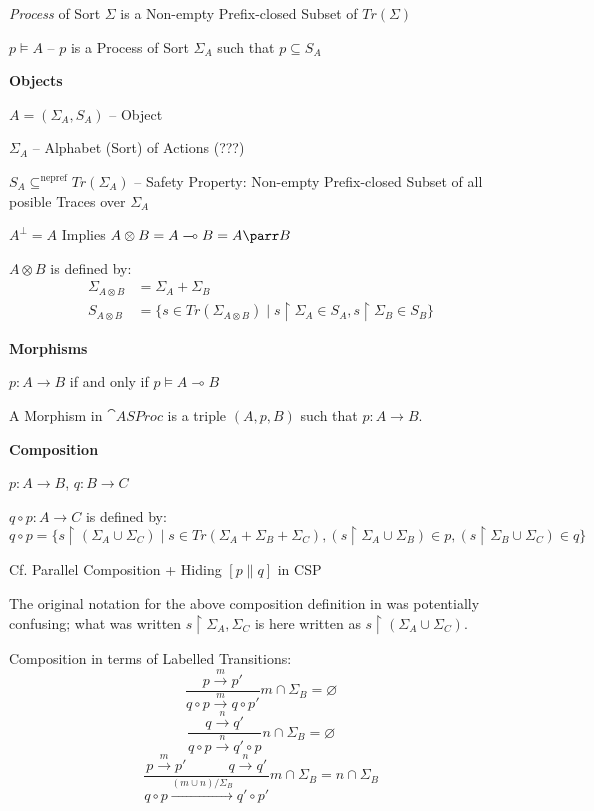 \emph{Process} of Sort $\Sigma$ is a Non-empty Prefix-closed Subset of
$Tr(\Sigma)$

$p \vDash A$ -- $p$ is a Process of Sort $\Sigma_A$ such that $p
\subseteq S_A$


\textbf{Objects}

$A = (\Sigma_A,S_A)$ -- Object

$\Sigma_A$ -- Alphabet (Sort) of Actions (???)

$S_A \subseteq^{\mathrm{nepref}} Tr(\Sigma_A)$ -- Safety Property:
Non-empty Prefix-closed Subset of all posible Traces over $\Sigma_A$

$A^\bot = A$ Implies $A \otimes B = A \multimap B = A \parr B$

$A \otimes B$ is defined by:
\begin{align*}
  \Sigma_{A \otimes B} &= \Sigma_A + \Sigma_B \\
  S_{A \otimes B} &= \{s \in Tr(\Sigma_{A \otimes B})
    \mid s \upharpoonright \Sigma_A \in S_A,
    s \upharpoonright \Sigma_B \in S_B\}
\end{align*}


\textbf{Morphisms}

$p : A \rightarrow B$ if and only if $p \vDash A \multimap B$

A Morphism in $\cat{ASProc}$ is a triple $(A,p,B)$ such that $p : A
\rightarrow B$.


\textbf{Composition}

$p : A \rightarrow B$, $q : B \rightarrow C$

$q \circ p : A \rightarrow C$ is defined by:
\[
  q \circ p = \{s \upharpoonright (\Sigma_A \cup \Sigma_C)
    \mid s \in Tr(\Sigma_A + \Sigma_B + \Sigma_C),
    (s \upharpoonright \Sigma_A \cup \Sigma_B) \in p,
    (s \upharpoonright \Sigma_B \cup \Sigma_C) \in q\}
\]

\fist Cf. Parallel Composition + Hiding $[p{\parallel}q]$ in CSP

\fist The original notation for the above composition definition in
\cite{abramsky-gay-nagarajan96} was potentially confusing; what was
written $s \upharpoonright \Sigma_A,\Sigma_C$ is here written as $s
\upharpoonright (\Sigma_A \cup \Sigma_C)$.

Composition in terms of Labelled Transitions:
\[
  \frac{p \xrightarrow{m} p'}
  {q \circ p \xrightarrow{m} q \circ p'}
  m \cap \Sigma_B = \varnothing
\]\[
  \frac{q \xrightarrow{n} q'}
  {q \circ p \xrightarrow{n} q' \circ p}
  n \cap \Sigma_B = \varnothing
\]\[
  \frac{p \xrightarrow{m} p' \quad\quad\quad q \xrightarrow{n} q'}
  {q \circ p \xrightarrow{(m \cup n)/\Sigma_B} q' \circ p'}
  m \cap \Sigma_B = n \cap \Sigma_B
\]


